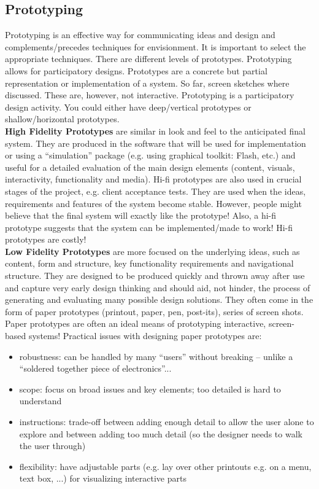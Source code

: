 \subsection{Prototyping}
Prototyping is an effective way for communicating ideas and design and complements/precedes techniques for envisionment. It is important to select the appropriate techniques. There are different levels of prototypes. Prototyping allows for participatory designs. Prototypes are a concrete but partial representation or implementation of a system. So far, screen sketches where discussed. These are, however, not interactive. Prototyping is a participatory design activity.
You could either have deep/vertical prototypes or shallow/horizontal prototypes.\\
\textbf{High Fidelity Prototypes} are  similar in look and feel to the anticipated final system. They are produced in the software that will be used for implementation or using a ``simulation'' package (e.g. using graphical toolkit: Flash, etc.) and useful for a detailed evaluation of the main design elements (content, visuals, interactivity, functionality and media). Hi-fi prototypes are also used in crucial stages of the project, e.g. client acceptance tests. They are used when the ideas, requirements and features of the system become stable. However, people might believe that the final system will exactly like the prototype! Also, a hi-fi prototype suggests that the system can be implemented/made to work! Hi-fi prototypes are costly!\\
\textbf{Low Fidelity Prototypes} are more focused on the underlying ideas, such as content, form and structure, key functionality requirements and navigational structure. They are designed to be produced quickly and thrown away after use and capture very early design thinking and should aid, not hinder, the process of generating and evaluating many possible design solutions. They often come in the form of paper prototypes (printout, paper, pen, post-its), series of screen shots. Paper prototypes are often an ideal means of prototyping interactive, screen-based systems!
Practical issues with designing paper prototypes are:
\begin{itemize}
\item robustness: can be handled by many ``users'' without breaking -- unlike a ``soldered together piece of electronics''...
\item scope: focus on broad issues and key elements; too detailed is hard to understand
\item instructions: trade-off between adding enough detail to allow the user alone to explore and between adding too much detail (so the designer needs to walk the user through)
\item flexibility: have adjustable parts (e.g. lay over other printouts e.g. on a menu, text box, ...) for visualizing interactive parts
\end{itemize}
